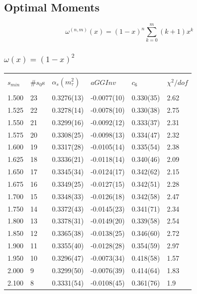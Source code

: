 \documentclass[../../index.tex]{subfiles}
\begin{document}
\subsection{Optimal Moments}

\begin{equation}
  \omega^{(n,m)}(x) = (1-x)^n\sum_{k=0}^m (k+1)x^k 
\end{equation}
\subsubsection{$\omega(x) = (1-x)^2$}
\begin{table}[H]
  \centering
  \begin{tabular}{llllll}
    \toprule \\
    $s_{min}$ & \#$s_0$s & $\alpha_s(m_\tau^2)$ & $aGGInv$ & $c_{6}$ & $\chi^2/dof$  \\
    \hline \\
    1.500 & 23 & 0.3276(13) & -0.0077(10) & 0.330(35) & 2.62 \\
    1.525 & 22 & 0.3278(14) & -0.0078(10) & 0.330(38) & 2.75 \\
    1.550 & 21 & 0.3299(16) & -0.0092(12) & 0.333(37) & 2.31 \\
    1.575 & 20 & 0.3308(25) & -0.0098(13) & 0.334(47) & 2.32 \\
    1.600 & 19 & 0.3317(28) & -0.0105(14) & 0.335(54) & 2.38 \\
    1.625 & 18 & 0.3336(21) & -0.0118(14) & 0.340(46) & 2.09 \\
    1.650 & 17 & 0.3345(34) & -0.0124(17) & 0.342(62) & 2.15 \\
    1.675 & 16 & 0.3349(25) & -0.0127(15) & 0.342(51) & 2.28 \\
    1.700 & 15 & 0.3348(33) & -0.0126(18) & 0.342(58) & 2.47 \\
    1.750 & 14 & 0.3372(43) & -0.0145(23) & 0.341(71) & 2.34 \\
    1.800 & 13 & 0.3378(31) & -0.0149(20) & 0.339(58) & 2.54 \\
    1.850 & 12 & 0.3365(38) & -0.0138(25) & 0.346(60) & 2.72 \\
    1.900 & 11 & 0.3355(40) & -0.0128(28) & 0.354(59) & 2.97 \\
    1.950 & 10 & 0.3296(47) & -0.0073(34) & 0.418(58) & 1.57 \\
    2.000 & 9  & 0.3299(50) & -0.0076(39) & 0.414(64) & 1.83 \\
    2.100 & 8  & 0.3331(54) & -0.0108(45) & 0.361(76) & 1.9 \\

\end{tabular}
\end{table}
\end{document}
